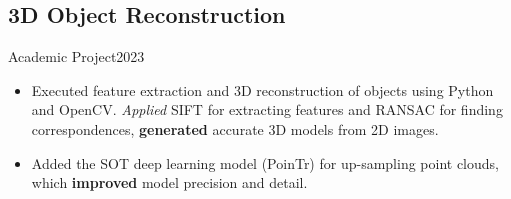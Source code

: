 \subsection{3D Object Reconstruction}{Academic Project}{2023}
\begin{itemize}
    \item Executed feature extraction and 3D reconstruction of objects using Python and OpenCV. \emph{Applied} SIFT for extracting features and RANSAC for finding correspondences, \textbf{generated} accurate 3D models from 2D images.
    \item Added the SOT deep learning model (PoinTr) for up-sampling point clouds, which \textbf{improved} model precision and detail.
\end{itemize}
